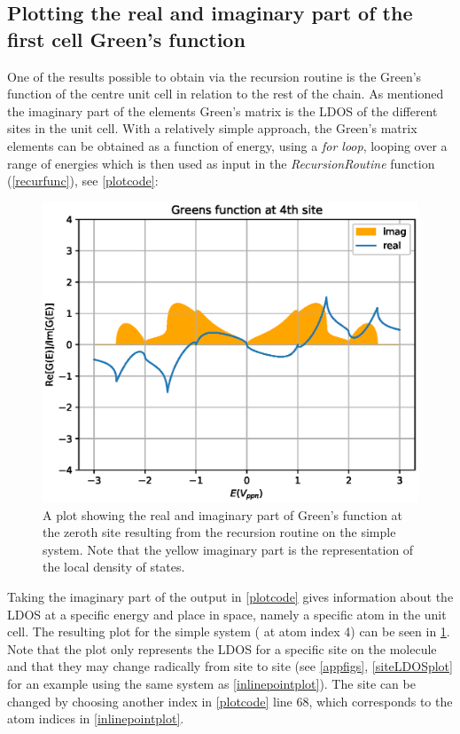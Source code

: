 \subsection{Plotting the real and imaginary part of the first cell Green's function}
One of the results possible to obtain via the recursion routine is the Green's function of the centre unit cell in relation to the rest of the chain. As mentioned the imaginary part of the elements Green's matrix is the LDOS of the different sites in the unit cell. With a relatively simple approach, the Green's matrix elements can be obtained as a function of energy, using a \textit{for loop}, looping over a range of energies which is then used as input in the \textit{RecursionRoutine} function (\cref{recurfunc}), see \cref{plotcode}:
\vspace{-1\baselineskip}
\vspace{\baselineskip}
\begin{figure}[ht]
	\includegraphics[width=.45\textwidth]{Figures/BetaimrealTE.eps}
	\caption{A plot showing the real and imaginary part of Green's function at the zeroth site resulting from the recursion routine on the simple system. Note that the yellow imaginary part is the representation of the local density of states.}
	\label{LDOSsimple}
\end{figure}
Taking the imaginary part of the output in \cref{plotcode} gives information about the LDOS at a specific energy and place in space, namely a specific atom in the unit cell. The resulting plot for the simple system ( at atom index 4) can be seen in \cref{LDOSsimple}. Note that the plot only represents the LDOS for a specific site on the molecule and that they may change radically from site to site (see \cref{appfigs}, \cref{siteLDOSplot} for an example using the same system as \cref{inlinepointplot}). The site can be changed by choosing another index in \cref{plotcode} line 68, which corresponds to the atom indices in \cref{inlinepointplot}.
